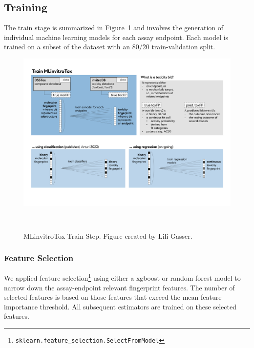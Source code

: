 \subsection{Training}
The train stage is summarized in Figure~\ref{fig:Project_overview_train} and involves the generation of individual machine learning models for each assay endpoint. Each model is trained on a subset of the dataset with an 80/20 train-validation split. 

\begin{figure}[h]
    \centering
    \includegraphics[width=1.0\textwidth]{figures/Project_overview_train.png}
    \caption{MLinvitroTox Train Step. Figure created by Lili Gasser.}
~\label{fig:Project_overview_train}
\end{figure}

\subsubsection{Feature Selection}
We applied feature selection\footnote{\texttt{sklearn.feature\_selection.SelectFromModel}} using either a xgboost or random forest model to narrow down the assay-endpoint relevant fingerprint features. The number of selected features is based on those features that exceed the mean feature importance threshold. All subsequent estimators are trained on these selected features.

